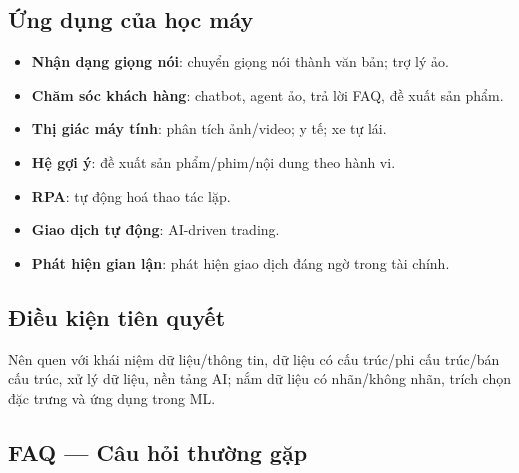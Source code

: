 \subsection{Ứng dụng của học máy}

\begin{phuongphap}[title={Một số ứng dụng thường gặp}]
\begin{itemize}
  \item \textbf{Nhận dạng giọng nói}: chuyển giọng nói thành văn bản; trợ lý ảo.
  \item \textbf{Chăm sóc khách hàng}: chatbot, agent ảo, trả lời FAQ, đề xuất sản phẩm.
  \item \textbf{Thị giác máy tính}: phân tích ảnh/video; y tế; xe tự lái.
  \item \textbf{Hệ gợi ý}: đề xuất sản phẩm/phim/nội dung theo hành vi.
  \item \textbf{RPA}: tự động hoá thao tác lặp.
  \item \textbf{Giao dịch tự động}: AI-driven trading.
  \item \textbf{Phát hiện gian lận}: phát hiện giao dịch đáng ngờ trong tài chính.
\end{itemize}
\end{phuongphap}

\subsection{Điều kiện tiên quyết}

\begin{luuy}[title={Prerequisites to Learn Machine LearningML}]
Nên quen với khái niệm dữ liệu/thông tin, dữ liệu có cấu trúc/phi cấu trúc/bán cấu trúc, xử lý dữ liệu, nền tảng AI;
nắm dữ liệu có nhãn/không nhãn, trích chọn đặc trưng và ứng dụng trong ML.
\end{luuy}

\subsection{FAQ --- Câu hỏi thường gặp}

